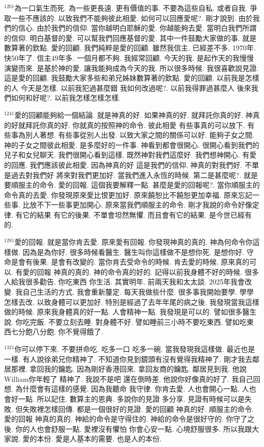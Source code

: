 \documentclass{book}
\begin{document}
$^{1201}$為一口氣生而死.
為一些更長遠.
更有價值的事.
不要為這些自私.
或者自我.
爭取一些不應該的.
以致我們不能夠彼此相愛.
如何可以回應愛呢?.
剛才說到.
由於我們的信心.
由於我們的信仰.
當你越明白耶穌的愛.
你越能夠去愛.
當明白我們所謂的信仰.
明白基督的愛.
可以幫我們回應基督的愛.
其中一件鼓勵大家做的事.
就是數算著的欽點.
愛的回顧.
我們純粹是愛的回顧.
雖然我信主.
已經差不多.
1970年.
快50年了.
信主49年多.
一個月都不夠.
我經常回顧.
今天的我.
是起作天的我慢慢演變而來.
是基於神的愛.
讓我能夠成為今天的我.
所以很多時候.
我很喜歡說見證.
這是愛的回顧.
我鼓勵大家多些和弟兄姊妹數算著的欽點.
愛的回顧.
以前我是怎樣的人 今天是怎樣.
以前我犯過甚麼錯 我如何改過呢?.
以前我得罪過甚麼人 後來我們如何和好呢?.
以前我怎樣怎樣怎樣.

$^{1241}$愛的回顧能夠給一個結論.
就是神真的好.
如果神真的好.
就拜託你真的好.
神真的好就拜託你真的好.
你就真的按照神的命令.
彼此相愛 有些事真的可以放下.
有些事為別人著想.
有些事從別人出發.
以致大家之間的關係可以好.
能夠子女之間.
神的子女之間彼此相愛.
是多麼好的一件事.
神看到都會很開心.
很開心看到我們的兒子和女兒聊天.
我們很開心看到這樣.
既然神對我們這麼好.
我們想神開心.
有愛的回應.
我們應該彼此相愛.
因為神真的好 這是我們的信仰.
神真的對我們好.
不單是過去對我們好 將來對我們更加好.
當我們進入永恆的時候.
第二是甚麼呢?.
就是要順服主的命令.
愛的回報.
這個我要解釋一點.
甚麼是愛的回報呢?.
當你順服主的命令真的去愛.
你發現原來愛比恨更加好.
原來饒恕比不饒恕更加幸福.
原來忘記一些事.
比放不下一些事更加開心.
原來當我們順服主的命令.
剛才我說的命令好像定律.
有它的結果 有它的後果.
不單會坦然無懼.
而且會有它的結果.
是今世已經有的.

$^{1281}$愛的回報.
就是當你肯去愛.
原來愛有回報.
你發現神真的真的.
神為何命令你這樣做.
因為是為你好.
很多時候看醫生.
醫生叫你這樣做不是想你死.
是想你好.
守命是會有後果.
是會有改變的.
當你肯去受命令的時候.
肯去愛的時候.
原來真的可以.
有愛的回報 神真的真的.
神的命令真的好的.
記得以前我身體不好的時候.
很多人給我很多勸告.
你吃東西 你生活.
其實明年.
前兩天我和太太談.
2025年我會改變.
我自己生活的方式.
我會重新釐定.
每天我做些什麼.
很多事我開始要學.
學學怎樣去改.
以致身體可以更加好.
特別是經過了去年年尾的病之後.
我發現當我這樣做的時候.
原來我身體真的好一點.
人會精神一點.
我發現是可以的.
譬如很多醫生說.
你吃完飯.
不要立刻去睡.
對身體不好.
譬如睡前三小時不要吃東西.
譬如吃東西七分飽八分飽.
你不覺得餓了.

$^{1321}$你可以停下來.
不要拼命吃.
吃多一口 吃多一碗.
當我發現我這樣做.
最近也是一樣.
有人說徐弟兄你精神了.
不知道你見到鏡頭有沒有覺得我精神了.
剛才我去鄰居那裡.
拿回我的鑰匙.
因為剛好香港回來.
拿回友商的鑰匙.
鄰居見到我.
他說William你年輕了 精神了.
我說不是吧 還在倒時差.
他說你好像真的好了.
我自己回想.
為什麼會有這樣的感覺.
因為我聽命 我守律.
你肯去愛.
人也會開心一點.
人也會好一點.
所以記住.
數算主的恩典.
多說你的見證 多分享.
見證有時候可以是失敗.
但失敗裡怎樣回傳.
都是一個很好的見證.
愛的回顧 神真的好.
順服主的命令.
愛的回報 神真的真的.
神給的命令是守得住的.
神給的命令是很好守的.
你守了之後.
你的人也會舒服一點.
愛裡沒有懼怕 你會心安一點.
心境舒服很多.
所以我跟大家說.
愛的本份.
愛是人基本的需要.
也是人的本份.
\end{document}

